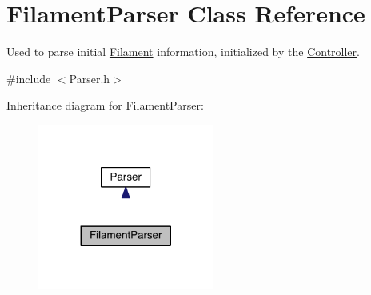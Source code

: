 \hypertarget{classFilamentParser}{\section{Filament\+Parser Class Reference}
\label{classFilamentParser}
}


Used to parse initial \hyperlink{classFilament}{Filament} information, initialized by the \hyperlink{classController}{Controller}.  




{\ttfamily \#include $<$Parser.\+h$>$}



Inheritance diagram for Filament\+Parser\+:\nopagebreak
\begin{figure}[H]
\begin{center}
\leavevmode
\includegraphics[width=164pt]{classFilamentParser__inherit__graph}
\end{center}
\end{figure}


